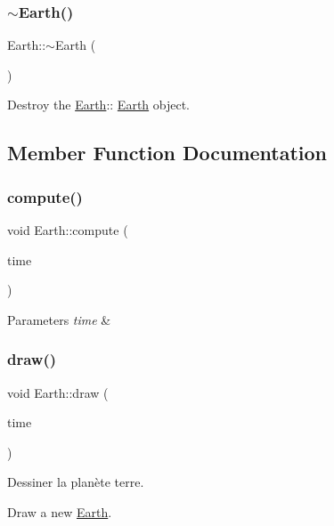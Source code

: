 \subsubsection{\texorpdfstring{$\sim$Earth()}{~Earth()}}
{\footnotesize\ttfamily Earth\+::$\sim$\+Earth (\begin{DoxyParamCaption}{ }\end{DoxyParamCaption})}



Destroy the \mbox{\hyperlink{classEarth}{Earth}}\+:\+: \mbox{\hyperlink{classEarth}{Earth}} object. 



\subsection{Member Function Documentation}
\mbox{\label{classEarth_a4f2e2881f1f05c3dea103425be8b16f1}} 
\subsubsection{\texorpdfstring{compute()}{compute()}}
{\footnotesize\ttfamily void Earth\+::compute (\begin{DoxyParamCaption}\item[{G\+Luint}]{time }\end{DoxyParamCaption})}


\begin{DoxyParams}{Parameters}
{\em time} & \\
\hline
\end{DoxyParams}
\mbox{\label{classEarth_aa71da3add5a747c3e85f70e5291effaf}} 
\subsubsection{\texorpdfstring{draw()}{draw()}}
{\footnotesize\ttfamily void Earth\+::draw (\begin{DoxyParamCaption}\item[{G\+Luint}]{time }\end{DoxyParamCaption})}



Dessiner la planète terre. 

Draw a new \mbox{\hyperlink{classEarth}{Earth}}.


